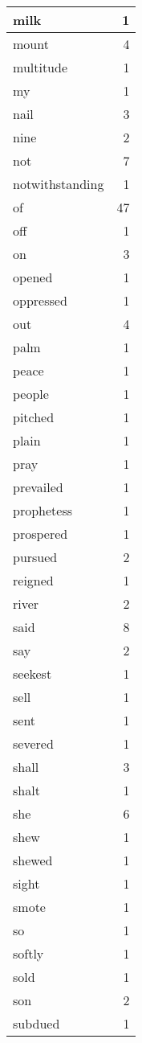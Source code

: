\begin{center}
\begin{longtable}{l|r}
milk & 1\\ \hline 
mount & 4\\ \hline 
multitude & 1\\ \hline 
my & 1\\ \hline 
nail & 3\\ \hline 
nine & 2\\ \hline 
not & 7\\ \hline 
notwithstanding & 1\\ \hline 
of & 47\\ \hline 
off & 1\\ \hline 
on & 3\\ \hline 
opened & 1\\ \hline 
oppressed & 1\\ \hline 
out & 4\\ \hline 
palm & 1\\ \hline 
peace & 1\\ \hline 
people & 1\\ \hline 
pitched & 1\\ \hline 
plain & 1\\ \hline 
pray & 1\\ \hline 
prevailed & 1\\ \hline 
prophetess & 1\\ \hline 
prospered & 1\\ \hline 
pursued & 2\\ \hline 
reigned & 1\\ \hline 
river & 2\\ \hline 
said & 8\\ \hline 
say & 2\\ \hline 
seekest & 1\\ \hline 
sell & 1\\ \hline 
sent & 1\\ \hline 
severed & 1\\ \hline 
shall & 3\\ \hline 
shalt & 1\\ \hline 
she & 6\\ \hline 
shew & 1\\ \hline 
shewed & 1\\ \hline 
sight & 1\\ \hline 
smote & 1\\ \hline 
so & 1\\ \hline 
softly & 1\\ \hline 
sold & 1\\ \hline 
son & 2\\ \hline 
subdued & 1\\ \hline 

\end{longtable}
\end{center}
